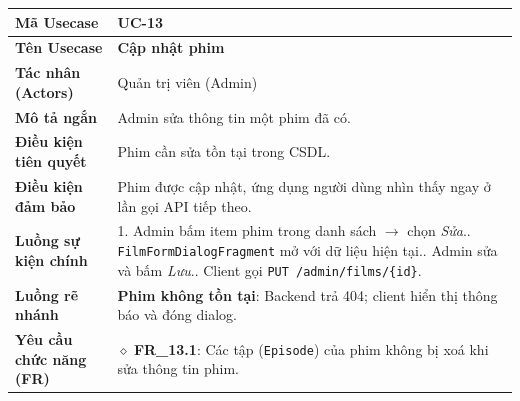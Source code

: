 \begin{table}[H]
\renewcommand{\arraystretch}{1.3}
\centering
\begin{tabularx}{\textwidth}{|p{4.5cm}|X|}
\hline
\cellcolor{gray!15}\bfseries Mã Usecase & \textbf{UC-13} \\ \hline
\cellcolor{gray!15}\bfseries Tên Usecase & \textbf{Cập nhật phim} \\ \hline
\cellcolor{gray!15}\bfseries Tác nhân (Actors) & Quản trị viên (Admin) \\ \hline
\cellcolor{gray!15}\bfseries Mô tả ngắn & Admin sửa thông tin một phim đã có. \\ \hline
\cellcolor{gray!15}\bfseries Điều kiện tiên quyết & Phim cần sửa tồn tại trong CSDL. \\ \hline
\cellcolor{gray!15}\bfseries Điều kiện đảm bảo & Phim được cập nhật, ứng dụng người dùng nhìn thấy ngay ở lần gọi API tiếp theo. \\ \hline
\cellcolor{gray!15}\bfseries Luồng sự kiện chính & 1. Admin bấm item phim trong danh sách $\rightarrow$ chọn \textit{Sửa}.\newline 2. \texttt{FilmFormDialogFragment} mở với dữ liệu hiện tại.\newline 3. Admin sửa và bấm \textit{Lưu}.\newline 4. Client gọi \texttt{PUT /admin/films/\{id\}}. \\ \hline
\cellcolor{gray!15}\bfseries Luồng rẽ nhánh & \textbf{Phim không tồn tại}: Backend trả 404; client hiển thị thông báo và đóng dialog. \\ \hline
\cellcolor{gray!15}\bfseries Yêu cầu chức năng (FR) & $\diamond$ \textbf{FR\_13.1}: Các tập (\texttt{Episode}) của phim không bị xoá khi sửa thông tin phim. \\ \hline
\end{tabularx}
\end{table}

